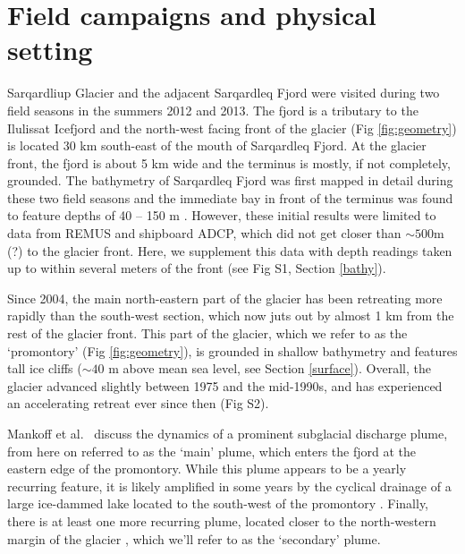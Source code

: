 \documentclass[30pt,letterpaper]{article}
\begin{document}


\section{Field campaigns and physical setting}

Sarqardliup Glacier and the adjacent Sarqardleq Fjord were visited during two field seasons in the summers 2012 and 2013. The fjord is a tributary to the Ilulissat Icefjord and the north-west facing front of the glacier (Fig \ref{fig:geometry}) is located 30 km south-east of the mouth of Sarqardleq Fjord. At the glacier front, the fjord is about 5 km wide and the terminus is mostly, if not completely, grounded. The bathymetry of Sarqardleq Fjord was first mapped in detail during these two field seasons and the immediate bay in front of the terminus was found to feature depths of 40 -- 150 m \citep{Stevens:2016tx}. However, these initial results were limited to data from REMUS and shipboard ADCP, which did not get closer than $\sim 500$m (?) to the glacier front. Here, we supplement this data with depth readings taken up to within several meters of the front (see Fig S1, Section \ref{bathy}). 

Since 2004, the main north-eastern part of the glacier has been retreating more rapidly than the south-west section, which now juts out by almost 1 km from the rest of the glacier front. This part of the glacier, which we refer to as the `promontory' (Fig \ref{fig:geometry}), is grounded in shallow bathymetry and features tall ice cliffs ($\sim 40$ m above mean sea level, see Section \ref{surface}). Overall, the glacier advanced slightly between 1975 and the mid-1990s, and has experienced an accelerating retreat ever since then (Fig S2). 

Mankoff et al.~\cite{Mankoff:2016jp} discuss the dynamics of a prominent subglacial discharge plume, from here on referred to as the `main' plume, which enters the fjord at the eastern edge of the promontory. While this plume appears to be a yearly recurring feature, it is likely amplified in some years by the cyclical drainage of a large ice-dammed lake located to the south-west of the promontory \citep{Kjeldsen:2017em}. Finally, there is at least one more recurring plume, located closer to the north-western margin of the glacier  \citep{Stevens:2016tx}, which we'll refer to as the `secondary' plume. 
\end{document}
